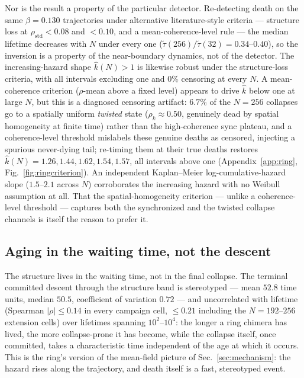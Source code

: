 \documentclass[pdflatex,sn-mathphys,Numbered]{sn-jnl}
\begin{document}
Nor is the result a property of the particular detector. Re-detecting death on
the same $\beta = 0.130$ trajectories under alternative literature-style
criteria --- structure loss at $\rho_{\mathrm{std}} < 0.08$ and $< 0.10$, and a
mean-coherence-level rule --- the median lifetime decreases with $N$ under every
one ($\tilde\tau(256)/\tilde\tau(32) = 0.34$--$0.40$), so the inversion is a
property of the near-boundary dynamics, not of the detector. The
increasing-hazard shape $\hat k(N) > 1$ is likewise robust under the
structure-loss criteria, with all intervals excluding one and $0\%$ censoring at
every $N$. A mean-coherence criterion ($\rho$-mean above a fixed level) appears
to drive $\hat k$ below one at large $N$, but this is a diagnosed censoring
artifact: $6.7\%$ of the $N = 256$ collapses go to a spatially uniform
\emph{twisted} state ($\rho_k \approx 0.50$, genuinely dead by spatial
homogeneity at finite time) rather than the high-coherence sync plateau, and a
coherence-level threshold mislabels these genuine deaths as censored, injecting
a spurious never-dying tail; re-timing them at their true deaths restores
$\hat k(N) = 1.26, 1.44, 1.62, 1.54, 1.57$, all intervals above one
(Appendix~\ref{app:ring}, Fig.~\ref{fig:ringcriterion}). An independent
Kaplan--Meier log-cumulative-hazard slope ($1.5$--$2.1$ across $N$) corroborates
the increasing hazard with no Weibull assumption at all. That the
spatial-homogeneity criterion --- unlike a coherence-level threshold ---
captures both the synchronized and the twisted collapse channels is itself the
reason to prefer it.

\subsection{Aging in the waiting time, not the descent}

The structure lives in the waiting time, not in the final collapse. The terminal
committed descent through the structure band is stereotyped --- mean $52.8$ time
units, median $50.5$, coefficient of variation $0.72$ --- and uncorrelated with
lifetime (Spearman $|\rho| \le 0.14$ in every campaign cell, $\le 0.21$
including the $N = 192$--$256$ extension cells) over lifetimes spanning
$10^2$--$10^4$: the longer a ring chimera has lived, the more collapse-prone it
has become, while the collapse itself, once committed, takes a characteristic
time independent of the age at which it occurs. This is the ring's version of
the mean-field picture of Sec.~\ref{sec:mechanism}: the hazard rises along the
trajectory, and death itself is a fast, stereotyped event.
\end{document}

